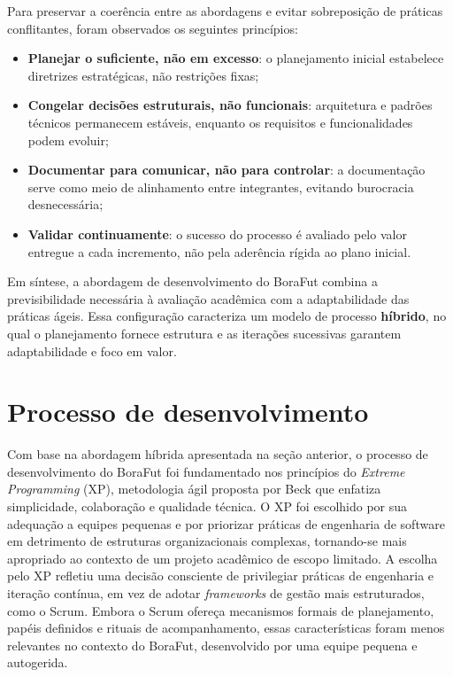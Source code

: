         Para preservar a coerência entre as abordagens e evitar sobreposição de práticas conflitantes, foram observados os seguintes princípios:
        \begin{itemize}
            \item \textbf{Planejar o suficiente, não em excesso}: o planejamento inicial estabelece diretrizes estratégicas, não restrições fixas;
            \item \textbf{Congelar decisões estruturais, não funcionais}: arquitetura e padrões técnicos permanecem estáveis, enquanto os requisitos e funcionalidades podem evoluir;
            \item \textbf{Documentar para comunicar, não para controlar}: a documentação serve como meio de alinhamento entre integrantes, evitando burocracia desnecessária;
            \item \textbf{Validar continuamente}: o sucesso do processo é avaliado pelo valor entregue a cada incremento, não pela aderência rígida ao plano inicial.
        \end{itemize}

        Em síntese, a abordagem de desenvolvimento do BoraFut combina a previsibilidade necessária à avaliação acadêmica com a adaptabilidade das práticas ágeis. Essa configuração caracteriza um modelo de processo \textbf{híbrido}, no qual o planejamento fornece estrutura e as iterações sucessivas garantem adaptabilidade e foco em valor.

\section{Processo de desenvolvimento}
    \label{sec:processo-desenvolvimento}

    Com base na abordagem híbrida apresentada na seção anterior, o processo de desenvolvimento do BoraFut foi fundamentado nos princípios do \textit{Extreme Programming} (XP), metodologia ágil proposta por Beck \cite{beck2000} que enfatiza simplicidade, colaboração e qualidade técnica. O XP foi escolhido por sua adequação a equipes pequenas e por priorizar práticas de engenharia de software em detrimento de estruturas organizacionais complexas, tornando-se mais apropriado ao contexto de um projeto acadêmico de escopo limitado.
    A escolha pelo XP refletiu uma decisão consciente de privilegiar práticas de engenharia e iteração contínua, em vez de adotar \textit{frameworks} de gestão mais estruturados, como o Scrum. Embora o Scrum ofereça mecanismos formais de planejamento, papéis definidos e rituais de acompanhamento, essas características foram menos relevantes no contexto do BoraFut, desenvolvido por uma equipe pequena e autogerida.

